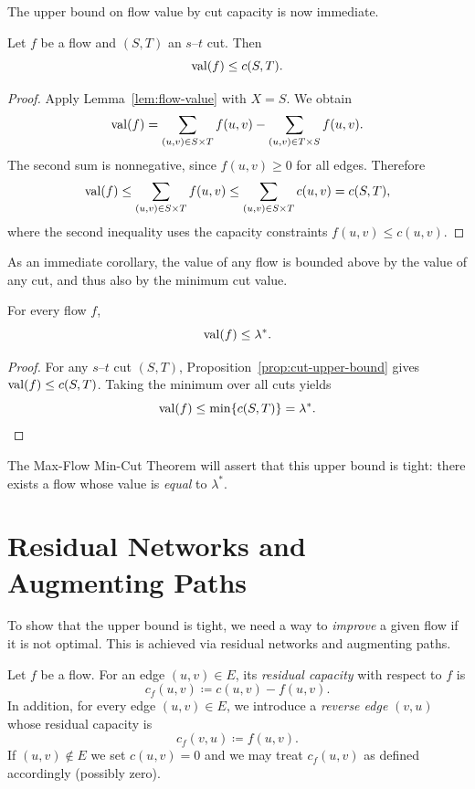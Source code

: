 \documentclass[11pt]{article}
\begin{document}
The upper bound on flow value by cut capacity is now immediate.

\begin{proposition}\label{prop:cut-upper-bound}
Let $f$ be a flow and $(S,T)$ an $s$--$t$ cut. Then
\[
  \mathrm{val}(f) \le c(S,T).
\]
\end{proposition}

\begin{proof}
Apply Lemma~\ref{lem:flow-value} with $X=S$. We obtain
\[
  \mathrm{val}(f)
  = \sum_{(u,v)\in S\times T} f(u,v)
    - \sum_{(u,v)\in T\times S} f(u,v).
\]
The second sum is nonnegative, since $f(u,v)\ge 0$ for all edges. Therefore
\[
  \mathrm{val}(f)
  \le \sum_{(u,v)\in S\times T} f(u,v)
  \le \sum_{(u,v)\in S\times T} c(u,v)
  = c(S,T),
\]
where the second inequality uses the capacity constraints $f(u,v)\le c(u,v)$.
\end{proof}

As an immediate corollary, the value of any flow is bounded above by the value
of any cut, and thus also by the minimum cut value.

\begin{corollary}\label{cor:flow-le-min-cut}
For every flow $f$,
\[
  \mathrm{val}(f) \le \lambda^*.
\]
\end{corollary}

\begin{proof}
For any $s$--$t$ cut $(S,T)$, Proposition~\ref{prop:cut-upper-bound} gives
$\mathrm{val}(f)\le c(S,T)$. Taking the minimum over all cuts yields
\[
  \mathrm{val}(f) \le \min\{c(S,T)\} = \lambda^*.
\]
\end{proof}

The Max-Flow Min-Cut Theorem will assert that this upper bound is tight:
there exists a flow whose value is \emph{equal} to $\lambda^*$.

\section{Residual Networks and Augmenting Paths}

To show that the upper bound is tight, we need a way to \emph{improve} a given
flow if it is not optimal. This is achieved via residual networks and augmenting
paths.

\begin{definition}
Let $f$ be a flow. For an edge $(u,v)\in E$, its \emph{residual capacity} with
respect to $f$ is
\[
  c_f(u,v) \coloneqq c(u,v) - f(u,v).
\]
In addition, for every edge $(u,v)\in E$, we introduce a \emph{reverse edge}
$(v,u)$ whose residual capacity is
\[
  c_f(v,u) \coloneqq f(u,v).
\]
If $(u,v)\notin E$ we set $c(u,v)=0$ and we may treat $c_f(u,v)$ as defined
accordingly (possibly zero).
\end{definition}
\end{document}
